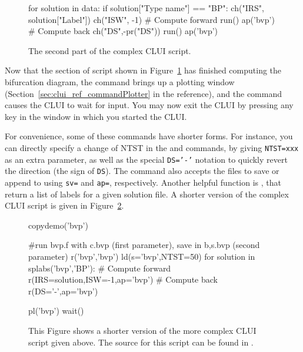 \documentclass[12pt]{report}
\begin{document}
 \begin{figure}[htbp]
 {\small \begin{center} \begin{boxedverbatim}
 for solution in data:
     if solution["Type name"] == "BP":
         ch("IRS", solution["Label"])
         ch("ISW", -1)
         # Compute forward
         run()
         ap('bvp')
         # Compute back
         ch("DS",-pr("DS"))
         run()
         ap('bvp')
 \end{boxedverbatim}
 \end{center} 
 }
 \caption[The second part of the  complex \AUTO CLUI script.]
 {The second part of the  complex \AUTO CLUI script.}
 \label{exa:clui_complex_third}
 \end{figure}

 Now that the section of script shown in 
 Figure~\ref{exa:clui_complex_third} has finished computing the
 bifurcation diagram, the command 
 brings up a plotting window 
 (Section~\ref{sec:clui_ref_commandPlotter} in the reference),
 and the command  causes the \AUTO CLUI
 to wait for input.  You may now exit the \AUTO CLUI
 by pressing any key in the window in which you started
 the \AUTO CLUI.

 For convenience, some of these commands have shorter forms.
 For instance, you can directly specify a change of NTST in
 the  and  commands, by giving
 {\tt NTST=xxx} as an extra parameter, as well as the special
 {\tt DS='-'} notation to quickly revert the direction (the sign
 of {\tt DS}). The command 
 also accepts the files to save or append to using
 {\tt sv=} and {\tt ap=}, respectively.
 Another helpful function
 is , that return a list of labels for a given
 solution file. A shorter version of the complex \AUTO
  CLUI script is given in Figure~\ref{exa:clui_complex_fourth}.

 \begin{figure}[htbp]
 {\small \begin{center} \begin{boxedverbatim}
 copydemo('bvp')

 #run bvp.f with c.bvp (first parameter), save in {b,s}.bvp (second parameter)
 r('bvp','bvp')
 ld(s='bvp',NTST=50)
 for solution in splabs('bvp','BP'):
     # Compute forward
     r(IRS=solution,ISW=-1,ap='bvp')
     # Compute back
     r(DS='-',ap='bvp')

 pl('bvp')
 wait()
 \end{boxedverbatim}
 \end{center} 
 }
 \caption[A complex example of a \AUTO CLUI script.]
 {This Figure shows a shorter version of the more complex \AUTO CLUI
   script given above.
 The source for this script can be found in .
 }
 \label{exa:clui_complex_fourth}
 \end{figure}
\end{document}
